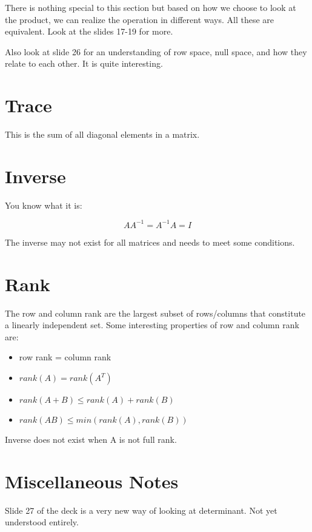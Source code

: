 There is nothing special to this section but based on how we choose to look at the product, we can realize the operation in different ways. All these are equivalent. Look at the slides 17-19 for more.

Also look at slide 26 for an understanding of row space, null space, and how they relate to each other. It is quite interesting.

\section{Trace}

This is the sum of all diagonal elements in a matrix.

\section{Inverse}

You know what it is:

\begin{equation}
    AA^{-1} = A^{-1}A = I
\end{equation}

The inverse may not exist for all matrices and needs to meet some conditions.

\section{Rank}

The row and column rank are the largest subset of rows/columns that constitute a linearly independent set. Some interesting properties of row and column rank are:

\begin{itemize}
    \item row rank = column rank
    \item $rank(A) = rank(A^T)$
    \item $rank(A+B) \leq rank(A) + rank(B)$
    \item $rank(AB) \leq min(rank(A), rank(B))$
\end{itemize}

Inverse does not exist when A is not full rank.

\section{Miscellaneous Notes}

Slide 27 of the deck is a very new way of looking at determinant. Not yet understood entirely.

